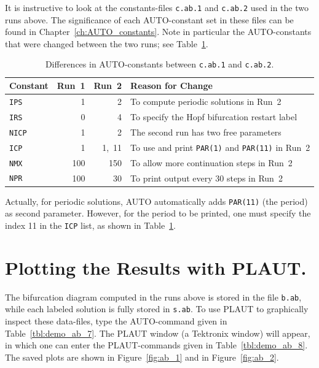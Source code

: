 \documentclass[12pt]{report}
\begin{document}
It is instructive to look at the constants-files
{\tt c.ab.1} and {\tt c.ab.2} used in the two runs above.
The significance of each {\cal AUTO}-constant set in these files
can be found in Chapter~\ref{ch:AUTO_constants}.
Note in particular the {\cal AUTO}-constants that were changed 
between the two runs; see Table~\ref{tbl:demo_ab_6}.
\begin{table}[htbp]
\begin{center}
\begin{tabular}{| l | r | r | l |}
\hline
  Constant &  Run~1  &  Run~2 & Reason for Change \\
\hline
  {\tt IPS}  & 1  & 2  &  To compute periodic solutions in Run~2 \\  
\hline
  {\tt IRS}  & 0  & 4  &  To specify the Hopf bifurcation restart label \\  
\hline
  {\tt NICP}  & 1  & 2  &  The second run has two free parameters\\  
\hline
  {\tt ICP}  & 1  &1,~11  &  To use and print {\tt PAR(1)} and {\tt PAR(11)} in Run~2\\  
\hline
  {\tt NMX}  & 100 &150  &  To allow more continuation steps in Run~2 \\  
\hline
  {\tt NPR}  & 100 & 30  &  To print output every 30 steps in Run~2 \\  
\hline
\end{tabular}
\caption{Differences in {\cal AUTO}-constants between {\tt c.ab.1} and {\tt c.ab.2}.}
\label{tbl:demo_ab_6}
\end{center}
\end{table}

Actually, for periodic solutions, {\cal AUTO} automatically adds {\tt PAR(11)}
(the period) as second parameter.
However, for the period to be printed, one must specify the index 11
in the {\tt ICP} list, as shown in Table~\ref{tbl:demo_ab_6}.

\section{ Plotting the Results with {\cal PLAUT}.} \label{sec:Tutorial_PLAUT}
The bifurcation diagram computed in the runs above
is stored in the file {\tt b.ab},
while each labeled solution is fully stored in {\tt s.ab}.
To use {\cal PLAUT} to graphically inspect these data-files,
type the {\cal AUTO}-command given in Table~\ref{tbl:demo_ab_7}.
The {\cal PLAUT} window (a Tektronix window) will appear, in which one can enter
the {\cal PLAUT}-commands given in Table~\ref{tbl:demo_ab_8}.
The saved plots are shown in Figure~\ref{fig:ab_1}
and  in Figure~\ref{fig:ab_2}.
\end{document}
